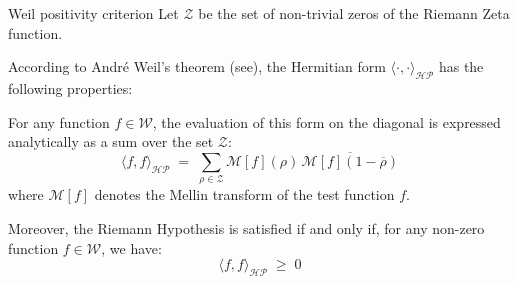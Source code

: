 \documentclass[Riemann_Hypothesis.tex]{subfiles}
\begin{document}
\begin{propositionEn}[label=pr:CriterePositiviteWeil]{Weil positivity criterion}
    Let $\mathcal{Z}$ be the set of non-trivial zeros of the Riemann Zeta function.\par
    According to André Weil's theorem (see\cite{weil1952_formules_en}), the Hermitian form $\langle \cdot, \cdot \rangle_{\mathcal{HP}}$ has the following properties: \par
    For any function $f \in \mathcal{W}$, the evaluation of this form on the diagonal is expressed analytically as a sum over the set $\mathcal{Z}$:
    \begin{equation*}
        \langle f, f \rangle_{\mathcal{HP}} \;=\; \sum_{\rho \in \mathcal{Z}} \mathcal{M}[f](\rho) \, \overline{\mathcal{M}[f](1 - \overline{\rho})}
    \end{equation*}
    where $\mathcal{M}[f]$ denotes the Mellin transform of the test function $f$. \par
    Moreover, the Riemann Hypothesis is satisfied if and only if, for any non-zero function $f \in \mathcal{W}$, we have:
    \begin{equation*}
        \langle f, f \rangle_{\mathcal{HP}} \;\geq\; 0
    \end{equation*}
\end{propositionEn}
\end{document}

